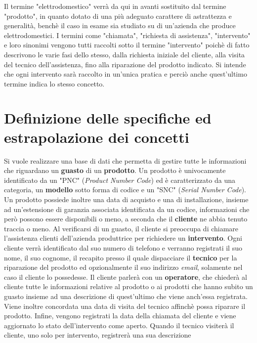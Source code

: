 \documentclass[a4paper, 12pt]{report}
\begin{document}
Il termine "elettrodomestico" verrà da qui in avanti sostituito dal termine "prodotto", in quanto dotato di una più adeguato carattere di astrattezza
e generalità, benchè il caso in esame sia studiato su di un'azienda che produce elettrodomestici. I termini come "chiamata", "richiesta di
assistenza", "intervento" e loro sinonimi vengono tutti raccolti sotto il termine "intervento" poichè di fatto descrivono le varie fasi dello
stesso, dalla richiesta iniziale del cliente, alla visita del tecnico dell'assistenza, fino alla riparazione del prodotto indicato. Si intende
che ogni intervento sarà raccolto in un'unica pratica e perciò anche quest'ultimo termine indica lo stesso concetto.

\section{Definizione delle specifiche ed estrapolazione dei concetti}
Si vuole realizzare una base di dati che permetta di gestire tutte le informazioni che riguardano un  \textbf{guasto} di un \textbf{prodotto}.
Un prodotto è univocamente identificato da un "PNC" (\textit{Product Number Code}) ed è caratterizzato da una categoria, un \textbf{modello} 
sotto forma di codice e un "SNC" (\textit{Serial Number Code}). Un prodotto possiede inoltre una data di acquisto e una di installazione, insieme ad 
un'estensione di garanzia associata identificata da un codice, informazioni che però possono essere disponibili o meno, a seconda che il \textbf{cliente}
ne abbia tenuto traccia o meno.\newline
Al verificarsi di un guasto, il cliente si preoccupa di chiamare l'assistenza clienti dell'azienda produttrice per richiedere un
\textbf{intervento}. Ogni cliente verrà identificato dal suo numero di telefono e verranno registrati il suo nome, il suo cognome,
il recapito presso il quale dispacciare il \textbf{tecnico} per la riparazione del prodotto ed opzionalmente il suo indirizzo \textit{email},
solamente nel caso il cliente lo possedesse.\newline
Il cliente parlerà con un \textbf{operatore}, che chiederà al cliente tutte le informazioni relative al prodotto o ai prodotti
che hanno subito un guasto insieme ad una descrizione di quest'ultimo che viene anch'essa registrata. Viene inoltre concordata una data di
visita del tecnico affinchè possa riparare il prodotto. Infine, vengono registrati la data della chiamata del cliente e viene
aggiornato lo stato dell'intervento come aperto. Quando il tecnico visiterà il cliente, uno solo per intervento, registrerà una sua descrizione
\end{document}
